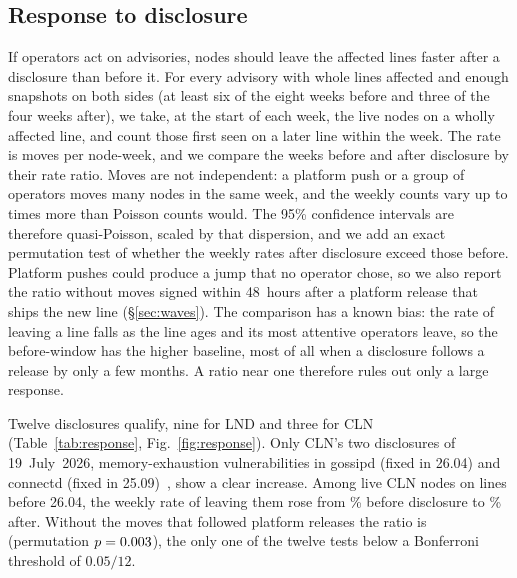\subsection{Response to disclosure}
\label{sec:response}
If operators act on advisories, nodes should leave the affected lines faster after a disclosure than before it. For
every advisory with whole lines affected and enough snapshots on both sides (at least six of the eight weeks before
and three of the four weeks after), we take, at the start of each week, the live nodes on a wholly affected line,
and count those first seen on a later line within the week. The rate is moves per node-week, and we compare the
weeks before and after disclosure by their rate ratio. Moves are not independent: a platform push or a group of
operators moves many nodes in the same week, and the weekly counts vary up to \RespMaxDisp{} times more than Poisson
counts would. The 95\% confidence intervals are therefore quasi-Poisson, scaled by that dispersion, and we add an exact
permutation test of whether the weekly rates after disclosure exceed those before. Platform pushes could produce a
jump that no operator chose, so we also report the ratio without moves signed within 48~hours after a platform
release that ships the new line (\S\ref{sec:waves}). The comparison has a known bias: the rate of leaving a line
falls as the line ages and its most attentive operators leave, so the before-window has the higher baseline, most of
all when a disclosure follows a release by only a few months. A ratio near one therefore rules out only a large
response.

Twelve disclosures qualify, nine for LND and three for CLN (Table~\ref{tab:response},
Fig.~\ref{fig:response}). Only CLN's two disclosures of 19~July~2026, memory-exhaustion vulnerabilities in gossipd
(fixed in 26.04) and connectd (fixed in 25.09)~\cite{pratap2026clndos}, show a clear increase. Among live CLN nodes on
lines before 26.04, the weekly rate of leaving them rose from \WkBeforeAllClnGossipd\% before disclosure to
\WkAfterAllClnGossipd\% after. Without the moves that followed platform releases the ratio is \RROpClnGossipd{}
(permutation $p=0.003$), the only one of the twelve tests below a Bonferroni threshold of $0.05/12$.

